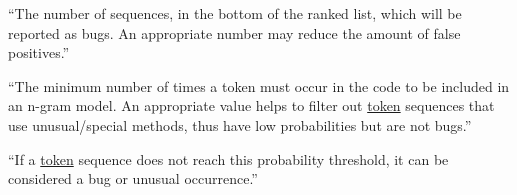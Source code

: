 \begin{definition}\label{def:reporting_size}
    ``The number of sequences, in the bottom of the ranked list, which will be reported as bugs. An appropriate number may reduce the amount of false positives.''~\cite{bugram}
\end{definition}

\begin{definition}\label{def:minimum_token_occurrence}
    ``The minimum number of times a token must occur in the code to be included in an n-gram model. An appropriate value helps to filter out \hyperref[def:token]{token} sequences that use unusual/special methods, thus have low probabilities but are not bugs.''~\cite{bugram}
\end{definition}

\begin{definition}\label{def:probability_threshold}
    ``If a \hyperref[def:token]{token} sequence does not reach this probability threshold, it can be considered a bug or unusual occurrence.''
\end{definition}